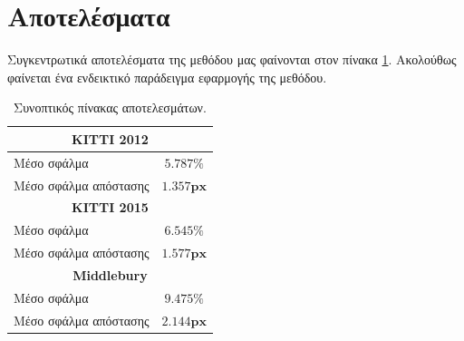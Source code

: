\documentclass{article}
\def\e{\selectlanguage{english}} %
\def\g{\selectlanguage{greek}}
\begin{document}
\section{Αποτελέσματα}

Συγκεντρωτικά αποτελέσματα της μεθόδου μας φαίνονται στον πίνακα \ref{tbl:results}. Ακολούθως φαίνεται ένα ενδεικτικό παράδειγμα εφαρμογής της μεθόδου. 

\begin{table}[t]

\centering
\begin{tabular}{l|c}
\multicolumn{2}{c}{\textbf{\e KITTI 2012 \g}} \\ \hline 
Μέσο σφάλμα & $5.787\%$\\
Μέσο σφάλμα απόστασης & $1.357 \mathbf{px}$\\
\multicolumn{2}{c}{\textbf{\e KITTI 2015 \g}} \\ \hline 
Μέσο σφάλμα & $6.545\%$\\
Μέσο σφάλμα απόστασης & $1.577 \mathbf{px}$\\	
\multicolumn{2}{c}{\textbf{\e Middlebury \g}} \\ \hline 
Μέσο σφάλμα & $9.475\%$\\
Μέσο σφάλμα απόστασης & $2.144 \mathbf{px}$\\	

\end{tabular}
\caption{Συνοπτικός πίνακας αποτελεσμάτων.}
\label{tbl:results}
\end{table}
\end{document}

